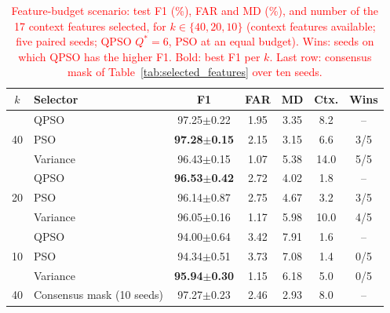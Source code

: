 \begin{table}[!t]
\centering
\scriptsize
\caption{\textcolor{red}{Feature-budget scenario: test F1 (\%), FAR and MD (\%), and number
of the 17 context features selected, for $k\in\{40,20,10\}$ (context features available; five paired seeds;
QPSO $Q^{*}{=}6$, PSO at an equal budget). Wins: seeds on which QPSO has the higher F1. Bold: best F1 per $k$.
Last row: consensus mask of Table~\ref{tab:selected_features} over ten seeds.}}
\label{tab:kbudget}
\color{red}
\setlength{\tabcolsep}{3pt}
\begin{tabular}{clccccc}
\hline\toprule
$k$ & Selector & F1 & FAR & MD & Ctx. & Wins \\
\hline\toprule
\multirow{3}{*}{40} & QPSO & 97.25$\pm$0.22 & 1.95 & 3.35 & 8.2 & -- \\
 & PSO & \textbf{97.28$\pm$0.15} & 2.15 & 3.15 & 6.6 & 3/5 \\
 & Variance & 96.43$\pm$0.15 & 1.07 & 5.38 & 14.0 & 5/5 \\
\midrule
\multirow{3}{*}{20} & QPSO & \textbf{96.53$\pm$0.42} & 2.72 & 4.02 & 1.8 & -- \\
 & PSO & 96.14$\pm$0.87 & 2.75 & 4.67 & 3.2 & 3/5 \\
 & Variance & 96.05$\pm$0.16 & 1.17 & 5.98 & 10.0 & 4/5 \\
\midrule
\multirow{3}{*}{10} & QPSO & 94.00$\pm$0.64 & 3.42 & 7.91 & 1.6 & -- \\
 & PSO & 94.34$\pm$0.51 & 3.73 & 7.08 & 1.4 & 0/5 \\
 & Variance & \textbf{95.94$\pm$0.30} & 1.15 & 6.18 & 5.0 & 0/5 \\
\midrule
40 & Consensus mask (10 seeds) & 97.27$\pm$0.23 & 2.46 & 2.93 & 8.0 & -- \\
\hline\toprule
\end{tabular}
\end{table}
